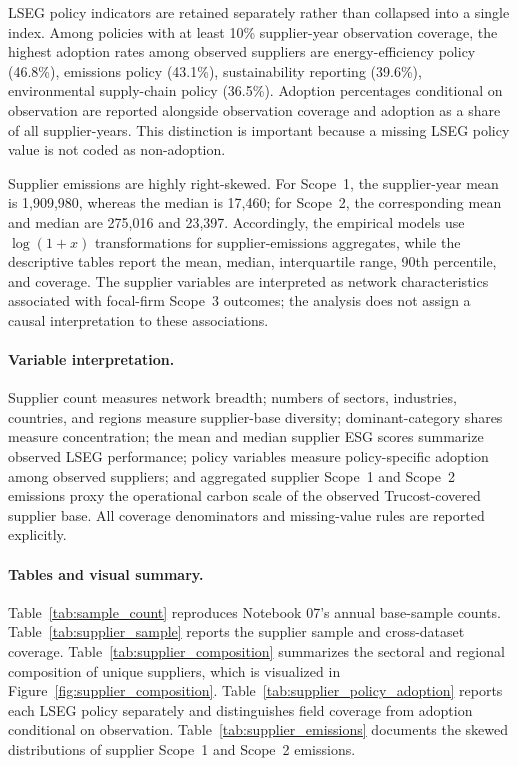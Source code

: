LSEG policy indicators are retained separately rather than collapsed into a single index. Among policies with at least 10\% supplier-year observation coverage, the highest adoption rates among observed suppliers are energy-efficiency policy (46.8\%), emissions policy (43.1\%), sustainability reporting (39.6\%), environmental supply-chain policy (36.5\%). Adoption percentages conditional on observation are reported alongside observation coverage and adoption as a share of all supplier-years. This distinction is important because a missing LSEG policy value is not coded as non-adoption.

Supplier emissions are highly right-skewed. For Scope~1, the supplier-year mean is 1,909,980, whereas the median is 17,460; for Scope~2, the corresponding mean and median are 275,016 and 23,397. Accordingly, the empirical models use $\log(1+x)$ transformations for supplier-emissions aggregates, while the descriptive tables report the mean, median, interquartile range, 90th percentile, and coverage. The supplier variables are interpreted as network characteristics associated with focal-firm Scope~3 outcomes; the analysis does not assign a causal interpretation to these associations.

\paragraph{Variable interpretation.} Supplier count measures network breadth; numbers of sectors, industries, countries, and regions measure supplier-base diversity; dominant-category shares measure concentration; the mean and median supplier ESG scores summarize observed LSEG performance; policy variables measure policy-specific adoption among observed suppliers; and aggregated supplier Scope~1 and Scope~2 emissions proxy the operational carbon scale of the observed Trucost-covered supplier base. All coverage denominators and missing-value rules are reported explicitly.

\paragraph{Tables and visual summary.}
Table~\ref{tab:sample_count} reproduces Notebook 07's annual base-sample counts. Table~\ref{tab:supplier_sample} reports the supplier sample and cross-dataset coverage. Table~\ref{tab:supplier_composition} summarizes the sectoral and regional composition of unique suppliers, which is visualized in Figure~\ref{fig:supplier_composition}. Table~\ref{tab:supplier_policy_adoption} reports each LSEG policy separately and distinguishes field coverage from adoption conditional on observation. Table~\ref{tab:supplier_emissions} documents the skewed distributions of supplier Scope~1 and Scope~2 emissions.


